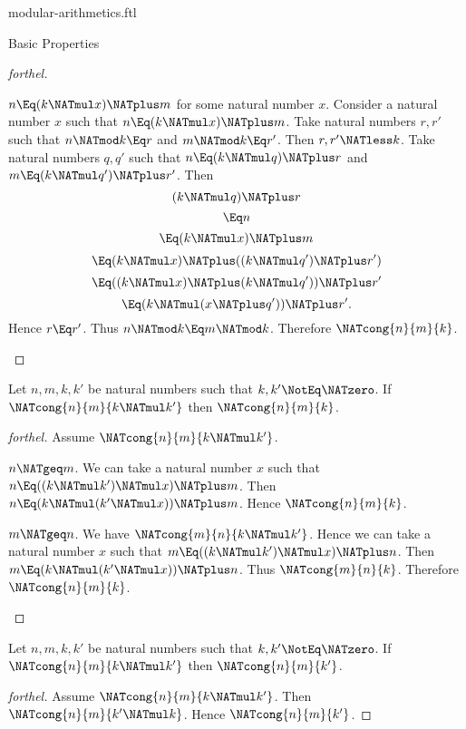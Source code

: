 \documentclass{stex}
\begin{document}
\begin{smodule}{modular-arithmetics.ftl}
\begin{sfragment}{Basic Properties}
\begin{proof}[forthel]
    \begin{case}{$n \Eq (k \NATmul x) \NATplus m$ for some natural number $x$.}
      Consider a natural number $x$ such that $n \Eq (k \NATmul x) \NATplus m$.
      Take natural numbers $r, r'$ such that $n \NATmod k \Eq r$ and $m \NATmod k \Eq r'$.
      Then $r, r' \NATless k$.
      Take natural numbers $q, q'$ such that $n \Eq (k \NATmul q) \NATplus r$ and $m \Eq (k \NATmul q') \NATplus r'$.
      Then
      \[  (k \NATmul q) \NATplus r                         \]
      \[    \Eq n                                   \]
      \[    \Eq (k \NATmul x) \NATplus m                     \]
      \[    \Eq (k \NATmul x) \NATplus ((k \NATmul q') \NATplus r')   \]
      \[    \Eq ((k \NATmul x) \NATplus (k \NATmul q')) \NATplus r'   \]
      \[    \Eq (k \NATmul (x \NATplus q')) \NATplus r'.            \]
      Hence $r \Eq r'$.
      Thus $n \NATmod k \Eq m \NATmod k$.
      Therefore $\NATcong{n}{m}{k}$.
    \end{case}
  \end{proof}

  \begin{proposition}[forthel]
    Let $n, m, k, k'$ be natural numbers such that $k, k' \NotEq \NATzero$.
    If $\NATcong{n}{m}{k \NATmul k'}$ then $\NATcong{n}{m}{k}$.
  \end{proposition}
  \begin{proof}[forthel]
    Assume $\NATcong{n}{m}{k \NATmul k'}$.

    \begin{case}{$n \NATgeq m$.}
      We can take a natural number $x$ such that $n \Eq ((k \NATmul k') \NATmul x) \NATplus m$.
      Then $n \Eq (k \NATmul (k' \NATmul x)) \NATplus m$.
      Hence $\NATcong{n}{m}{k}$.
    \end{case}

    \begin{case}{$m \NATgeq n$.}
      We have $\NATcong{m}{n}{k \NATmul k'}$.
      Hence we can take a natural number $x$ such that $m \Eq ((k \NATmul k') \NATmul x) \NATplus n$.
      Then $m \Eq (k \NATmul (k' \NATmul x)) \NATplus n$.
      Thus $\NATcong{m}{n}{k}$.
      Therefore $\NATcong{n}{m}{k}$.
    \end{case}
  \end{proof}

  \begin{corollary}[forthel]
    Let $n, m, k, k'$ be natural numbers such that $k, k' \NotEq \NATzero$.
    If $\NATcong{n}{m}{k \NATmul k'}$ then $\NATcong{n}{m}{k'}$.
  \end{corollary}
  \begin{proof}[forthel]
    Assume $\NATcong{n}{m}{k \NATmul k'}$.
    Then $\NATcong{n}{m}{k' \NATmul k}$.
    Hence $\NATcong{n}{m}{k'}$.
  \end{proof}


\end{sfragment}
\end{smodule}
\end{document}
